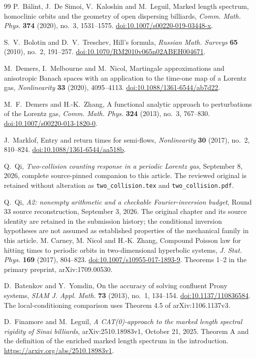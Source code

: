 \begin{thebibliography}{99}
P.~B\'alint, J.~De Simoi, V.~Kaloshin and M.~Leguil,
Marked length spectrum, homoclinic orbits and the geometry of open
dispersing billiards, \emph{Comm. Math. Phys.} \textbf{374} (2020),
no.~3, 1531--1575.
\href{https://doi.org/10.1007/s00220-019-03448-x}{doi:10.1007/s00220-019-03448-x}.

S.~V.~Bolotin and D.~V.~Treschev, Hill's formula,
\emph{Russian Math. Surveys} \textbf{65} (2010), no.~2, 191--257.
\href{https://doi.org/10.1070/RM2010v065n02ABEH004671}{doi:10.1070/RM2010v065n02ABEH004671}.

M.~Demers, I.~Melbourne and M.~Nicol, Martingale approximations and
anisotropic Banach spaces with an application to the time-one map of a
Lorentz gas, \emph{Nonlinearity} \textbf{33} (2020), 4095--4113.
\href{https://doi.org/10.1088/1361-6544/ab7d22}{doi:10.1088/1361-6544/ab7d22}.

M.~F.~Demers and H.-K.~Zhang, A functional analytic approach to
perturbations of the Lorentz gas, \emph{Comm. Math. Phys.}
\textbf{324} (2013), no.~3, 767--830.
\href{https://doi.org/10.1007/s00220-013-1820-0}{doi:10.1007/s00220-013-1820-0}.

J.~Marklof, Entry and return times for semi-flows,
\emph{Nonlinearity} \textbf{30} (2017), no.~2, 810--824.
\href{https://doi.org/10.1088/1361-6544/aa518b}{doi:10.1088/1361-6544/aa518b}.

Q.~Qi, \emph{Two-collision counting response in a periodic Lorentz gas},
September 8, 2026, complete source-pinned companion to this article.
The reviewed original is retained without alteration as
\texttt{two\_collision.tex} and \texttt{two\_collision.pdf}.

Q.~Qi, \emph{A2: nonempty arithmetic and a checkable Fourier-inversion
budget}, Round 33 source reconstruction, September 3, 2026.
The original chapter and its source identity are retained in the
submission history; the conditional inversion hypotheses are not assumed
as established properties of the mechanical family in this article.
M. Carney, M. Nicol and H.-K. Zhang,
Compound Poisson law for hitting times to periodic orbits in two-dimensional
hyperbolic systems, \emph{J. Stat. Phys.} \textbf{169} (2017), 804--823.
\href{https://doi.org/10.1007/s10955-017-1893-9}{doi:10.1007/s10955-017-1893-9}.
Theorems 1--2 in the primary preprint, arXiv:1709.00530.

D.~Batenkov and Y.~Yomdin, On the accuracy of solving confluent Prony
systems, \emph{SIAM J. Appl. Math.} \textbf{73} (2013), no.~1,
134--154. \href{https://doi.org/10.1137/110836584}{doi:10.1137/110836584}.
The local-conditioning comparison uses Theorem 4.5 of
arXiv:1106.1137v3.

D.~Finamore and M.~Leguil, \emph{A CAT(0)-approach to the marked
length spectral rigidity of Sinai billiards}, arXiv:2510.18983v1,
October 21, 2025. Theorem A and the definition of the enriched
marked length spectrum in the introduction.
\url{https://arxiv.org/abs/2510.18983v1}.
\end{thebibliography}
